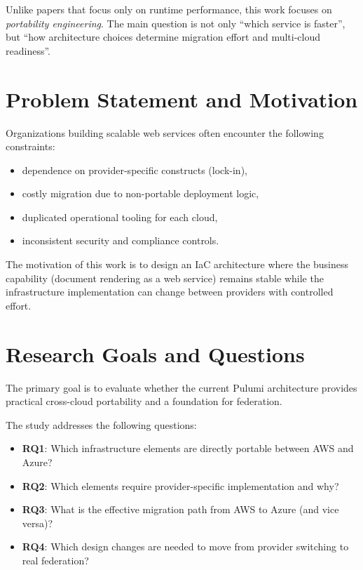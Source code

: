 \documentclass[conference]{IEEEtran}
\begin{document}
Unlike papers that focus only on runtime performance, this work focuses on \textit{portability engineering}. The main question is not only ``which service is faster'', but ``how architecture choices determine migration effort and multi-cloud readiness''.

\section{Problem Statement and Motivation}
Organizations building scalable web services often encounter the following constraints:
\begin{itemize}
    \item dependence on provider-specific constructs (lock-in),
    \item costly migration due to non-portable deployment logic,
    \item duplicated operational tooling for each cloud,
    \item inconsistent security and compliance controls.
\end{itemize}

The motivation of this work is to design an IaC architecture where the business capability (document rendering as a web service) remains stable while the infrastructure implementation can change between providers with controlled effort.

\section{Research Goals and Questions}
The primary goal is to evaluate whether the current Pulumi architecture provides practical cross-cloud portability and a foundation for federation.

The study addresses the following questions:
\begin{itemize}
    \item \textbf{RQ1}: Which infrastructure elements are directly portable between AWS and Azure?
    \item \textbf{RQ2}: Which elements require provider-specific implementation and why?
    \item \textbf{RQ3}: What is the effective migration path from AWS to Azure (and vice versa)?
    \item \textbf{RQ4}: Which design changes are needed to move from provider switching to real federation?
\end{itemize}
\end{document}
